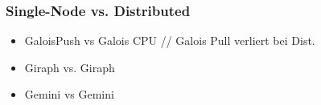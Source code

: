 \subsubsection{Single-Node vs. Distributed}
\begin{itemize}
	\item GaloisPush vs Galois CPU // Galois Pull verliert bei Dist.
	\item Giraph vs. Giraph
	\item Gemini vs Gemini
\end{itemize}



